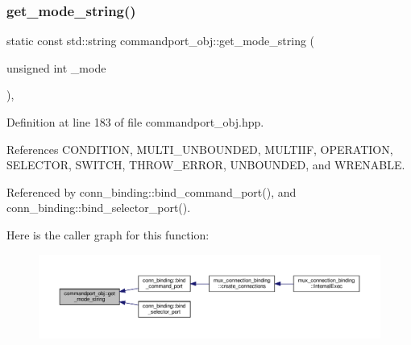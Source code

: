 \mbox{\label{classcommandport__obj_aa6c5c7124b925fa46de54d8efddc5bf0}} 
\subsubsection{\texorpdfstring{get\+\_\+mode\+\_\+string()}{get\_mode\_string()}}
{\footnotesize\ttfamily static const std\+::string commandport\+\_\+obj\+::get\+\_\+mode\+\_\+string (\begin{DoxyParamCaption}\item[{unsigned int}]{\+\_\+mode }\end{DoxyParamCaption})\hspace{0.3cm}{\ttfamily [inline]}, {\ttfamily [static]}}



Definition at line 183 of file commandport\+\_\+obj.\+hpp.



References C\+O\+N\+D\+I\+T\+I\+ON, M\+U\+L\+T\+I\+\_\+\+U\+N\+B\+O\+U\+N\+D\+ED, M\+U\+L\+T\+I\+IF, O\+P\+E\+R\+A\+T\+I\+ON, S\+E\+L\+E\+C\+T\+OR, S\+W\+I\+T\+CH, T\+H\+R\+O\+W\+\_\+\+E\+R\+R\+OR, U\+N\+B\+O\+U\+N\+D\+ED, and W\+R\+E\+N\+A\+B\+LE.



Referenced by conn\+\_\+binding\+::bind\+\_\+command\+\_\+port(), and conn\+\_\+binding\+::bind\+\_\+selector\+\_\+port().

Here is the caller graph for this function\+:
\nopagebreak
\begin{figure}[H]
\begin{center}
\leavevmode
\includegraphics[width=350pt]{d2/d56/classcommandport__obj_aa6c5c7124b925fa46de54d8efddc5bf0_icgraph}
\end{center}
\end{figure}
\mbox{\label{classcommandport__obj_a6b439abbd878de897af649fb41ceeb74}} 
